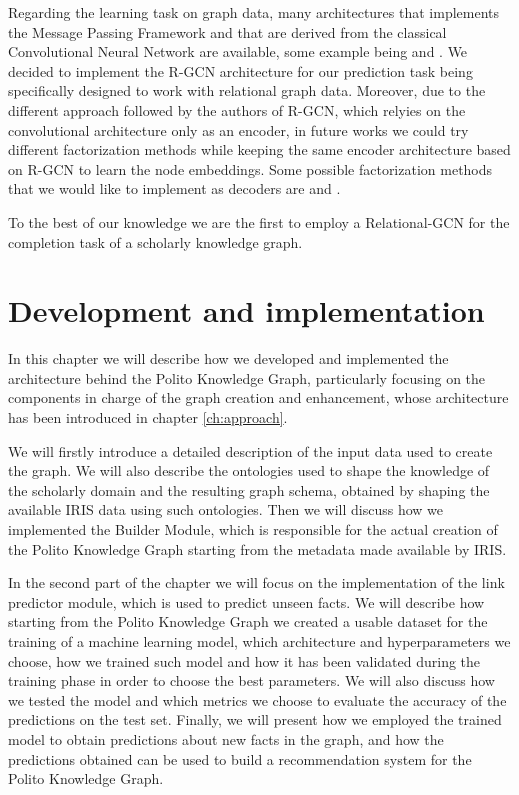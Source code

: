 \documentclass[%
    corpo=13.5pt,
    twoside,
    oldstyle,
    tipotesi=magistrale,
    greek,
    evenboxes
]{toptesi}
\begin{document}
Regarding the learning task on graph data, many architectures that implements
the Message Passing Framework\cite{gilmer2017} and that are derived from the
classical Convolutional Neural Network are available, some example being
\cite{defferrard2016} and \cite{duvenaud2015}.
We decided to implement the R-GCN architecture for our prediction task
being specifically designed to work with relational graph data.
Moreover, due to the different approach followed by the authors of R-GCN, which
relyies on the convolutional architecture only as an encoder, in future works
we could try different factorization methods while keeping the same encoder
architecture based on R-GCN to learn the node embeddings.
Some possible factorization methods that we would like to implement
as decoders are \cite{kazemi2018} and \cite{trouillon2016}.

To the best of our knowledge we are the first to employ a
Relational-GCN for the completion task of a scholarly knowledge graph.




\chapter{Development and implementation}

In this chapter we will describe how we developed and implemented the
architecture behind the Polito Knowledge Graph, particularly focusing
on the components in charge of the graph creation and enhancement, whose
architecture has been introduced in chapter \ref{ch:approach}.

We will firstly introduce a detailed description of the input data used to
create the graph. We will also describe the ontologies used to shape the
knowledge of the scholarly domain and the resulting graph schema, obtained
by shaping the available IRIS data using such ontologies.
Then we will discuss how we implemented the Builder Module, which is
responsible for the actual creation of the Polito Knowledge Graph starting
from the metadata made available by IRIS.

In the second part of the chapter we will focus on the implementation of the
link predictor module, which is used to predict unseen facts.
We will describe how starting from the Polito Knowledge Graph we created
a usable dataset for the training of a machine learning model, which
architecture and hyperparameters we choose, how we trained such model and
how it has been validated during the training phase in order to choose the
best parameters.
We will also discuss how we tested the model and which metrics we choose
to evaluate the accuracy of the predictions on the test set.
Finally, we will present how we employed the trained model to obtain
predictions about new facts in the graph, and how the predictions obtained
can be used to build a recommendation system for the Polito Knowledge Graph.
\end{document}
